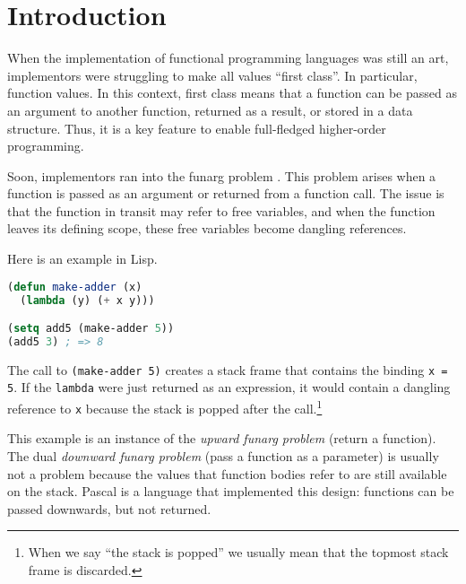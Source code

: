 \documentclass[sigplan,review,dvipsnames,screen,10pt]{acmart}
\begin{document}

\maketitle
{}

\section{Introduction}

When the implementation of functional programming languages was still
an art, implementors were struggling to make all values ``first
class''. In particular, function values. In this context, first
class means that a function can be passed as an argument to another
function, returned as a result, or stored in a data structure. Thus,
it is a key feature to enable full-fledged higher-order programming.

Soon, implementors ran into the funarg problem \cite{moses70:_funct_lisp_funar}. This problem arises
when a function is passed as an argument or returned from a function
call. The issue is that the function in transit may refer to free
variables, and when the function leaves its defining scope, these free
variables become dangling references. 

Here is an example in Lisp.
\begin{lstlisting}[language=lisp]
(defun make-adder (x)
  (lambda (y) (+ x y)))

(setq add5 (make-adder 5))
(add5 3) ; => 8
\end{lstlisting}
The call to \lstinline|(make-adder 5)| creates a stack frame that
contains the binding \texttt{x = 5}. If the \lstinline|lambda| were just
returned as an expression, it would contain a dangling reference to
\texttt{x} because the stack is popped after the call.\footnote{When
  we say ``the stack is popped'' we usually mean that the topmost
  stack frame is discarded.}

This example is an instance of the \emph{upward funarg problem}
(return a function). The
dual \emph{downward funarg problem} (pass a function as a parameter)
is usually not a problem 
because the values that function bodies refer to are still available
on the stack. Pascal \cite{jensen91:_pascal} is a language that implemented this design:
functions can be passed downwards, but not returned. 
\end{document}
